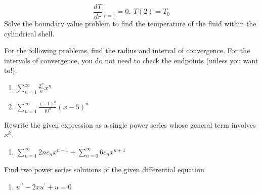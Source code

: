 \begin{fullwidth}
\begin{enumerate}[resume]
\begin{equation*}
\frac{dT}{dr}\Bigr|_{r=1} = 0, \ T(2)=T_0
\end{equation*}
Solve the boundary value problem to find the temperature of the fluid within the cylindrical shell.

\vspace{5.0cm}

\end{enumerate}

For the following problems, find the radius and interval of convergence.  For the intervals of convergence, you do not need to check the endpoints (unless you want to!).
\begin{enumerate}[resume]
\item $\sum\limits_{n=1}^{\infty} \frac{2^n}{n}x^n$

\vspace{1.0cm}

\item $\sum\limits_{n=1}^{\infty}\frac{(-1)^n}{10^n}(x-5)^n$

\vspace{1.0cm}

\end{enumerate}

Rewrite the given expression as a single power series whose general term involves $x^k$.
\begin{enumerate}[resume]
\item $\sum\limits_{n=1}^{\infty}2nc_nx^{n-1} + \sum\limits_{n=0}^{\infty}6c_nx^{n+1}$

\vspace{1.0cm}

\end{enumerate}

Find two power series solutions of the given differential equation

\begin{enumerate}[resume]
\item $u^{\prime \prime}-2xu^{\prime} + u = 0$

\vspace{1.0cm}
\end{enumerate}




\end{fullwidth}
